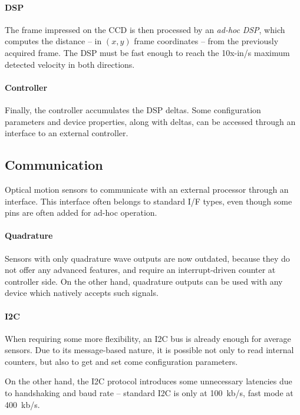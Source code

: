 \documentclass[a4paper,10pt]{article}
\begin{document}
\begin{multicols}{2}
\paragraph{DSP}
The frame impressed on the CCD is then processed by an \textit{ad-hoc}
\emph{DSP}, which computes the distance -- in $(x,y)$ frame coordinates --
from the previously acquired frame. The DSP must be fast enough to reach the
10x-in/s maximum detected velocity in both directions.


\paragraph{Controller}
Finally, the controller accumulates the DSP deltas. Some configuration
parameters and device properties, along with deltas, can be accessed through
an interface to an external controller.


\subsection{Communication}

Optical motion sensors to communicate with an external processor through an
interface. This interface often belongs to standard I/F types, even though
some pins are often added for ad-hoc operation.


\paragraph{Quadrature}
Sensors with only quadrature wave outputs are now outdated, because they do
not offer any advanced features, and require an interrupt-driven counter
at controller side. On the other hand, quadrature outputs can be used with
any device which natively accepts such signals.


\paragraph{I2C}
When requiring some more flexibility, an I2C bus is already enough for average
sensors. Due to its message-based nature, it is possible not only to read
internal counters, but also to get and set come configuration parameters.

On the other hand, the I2C protocol introduces some unnecessary latencies
due to handshaking and baud rate -- standard I2C is only at 100~kb/s, fast
mode at 400~kb/s.



\end{multicols}
\end{document}

